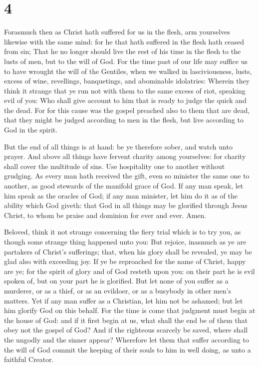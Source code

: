 \hypertarget{section-3}{%
\section{4}\label{section-3}}

 Forasmuch then as Christ hath suffered for us in the flesh,
arm yourselves likewise with the same mind: for he that hath suffered in
the flesh hath ceased from sin;  That he no longer should
live the rest of his time in the flesh to the lusts of men, but to the
will of God.  For the time past of our life may suffice us
to have wrought the will of the Gentiles, when we walked in
lasciviousness, lusts, excess of wine, revellings, banquetings, and
abominable idolatries:  Wherein they think it strange that
ye run not with them to the same excess of riot, speaking evil of you:
 Who shall give account to him that is ready to judge the
quick and the dead.  For for this cause was the gospel
preached also to them that are dead, that they might be judged according
to men in the flesh, but live according to God in the spirit.

 But the end of all things is at hand: be ye therefore
sober, and watch unto prayer.  And above all things have
fervent charity among yourselves: for charity shall cover the multitude
of sins.  Use hospitality one to another without grudging.
 As every man hath received the gift, even so minister the
same one to another, as good stewards of the manifold grace of God.
 If any man speak, let him speak as the oracles of God; if
any man minister, let him do it as of the ability which God giveth: that
God in all things may be glorified through Jesus Christ, to whom be
praise and dominion for ever and ever. Amen.

 Beloved, think it not strange concerning the fiery trial
which is to try you, as though some strange thing happened unto you:
 But rejoice, inasmuch as ye are partakers of Christ's
sufferings; that, when his glory shall be revealed, ye may be glad also
with exceeding joy.  If ye be reproached for the name of
Christ, happy are ye; for the spirit of glory and of God resteth upon
you: on their part he is evil spoken of, but on your part he is
glorified.  But let none of you suffer as a murderer, or as
a thief, or as an evildoer, or as a busybody in other men's matters.
 Yet if any man suffer as a Christian, let him not be
ashamed; but let him glorify God on this behalf.  For the
time is come that judgment must begin at the house of God: and if it
first begin at us, what shall the end be of them that obey not the
gospel of God?  And if the righteous scarcely be saved,
where shall the ungodly and the sinner appear?  Wherefore
let them that suffer according to the will of God commit the keeping of
their souls to him in well doing, as unto a faithful Creator.

